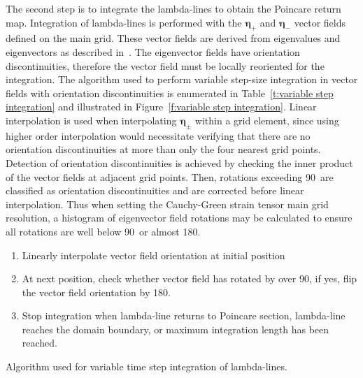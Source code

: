 \documentclass{article}
\begin{document}
The second step is to integrate the lambda-lines to obtain the Poincare return map. Integration of lambda-lines is performed with the $\boldsymbol \eta_+$ and $\boldsymbol \eta_-$ vector fields defined on the main grid. These vector fields are derived from eigenvalues and eigenvectors as described in~\textcite{farazmand12:_comput_lagran}. The eigenvector fields have orientation discontinuities, therefore the vector field must be locally reoriented for the integration. The algorithm used to perform variable step-size integration in vector fields with orientation discontinuities is enumerated in Table~\ref{t:variable step integration} and illustrated in Figure~\ref{f:variable step integration}. Linear interpolation is used when interpolating $\boldsymbol \eta_\pm$ within a grid element, since using higher order interpolation would necessitate verifying that there are no orientation discontinuities at more than only the four nearest grid points. Detection of orientation discontinuities is achieved by checking the inner product of the vector fields at adjacent grid points. Then, rotations exceeding 90\degree\, are classified as orientation discontinuities and are corrected before linear interpolation. Thus when setting the Cauchy-Green strain tensor main grid resolution, a histogram of eigenvector field rotations may be calculated to ensure all rotations are well below 90\degree\, or almost 180\degree.

\begin{table}
\begin{enumerate}
\item Linearly interpolate vector field orientation at initial position
\item At next position, check whether vector field has rotated by over 90\degree, if yes, flip the vector field orientation by 180\degree.
\item Stop integration when lambda-line returns to Poincare section, lambda-line reaches the domain boundary, or maximum integration length has been reached.
\end{enumerate}
\caption{Algorithm used for variable time step integration of lambda-lines.}
\label{t:variable step integration}
\end{table}
\end{document}
